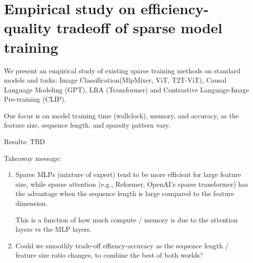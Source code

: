 \section{Empirical study on efficiency-quality tradeoff of sparse model training}
\label{sec:observations}

We present an empirical study of existing sparse training methods on standard models and tasks: Image Classification(MlpMixer, ViT, T2T-ViT),  Causal Language Modeling (GPT), LRA (Transformer) and Contrastive Language-Image Pre-training (CLIP).

Our focus is on model training time (wallclock), memory, and accuracy, as the feature size, sequence length, and sparsity pattern vary.

Results: TBD

Takeaway message:
\begin{enumerate}
  \item Sparse MLPs (mixture of expert) tend to be more efficient for large feature size, while sparse attention (e.g., Reformer, OpenAI's sparse transformer) has the advantage when the sequence length is large compared to the feature dimension.
  
  This is a function of how much compute / memory is due to the attention layers vs the MLP layers.
  
  \item Could we smoothly trade-off effiency-accuracy as the sequence length / feature size ratio changes, to combine the best of both worlds?
  
\end{enumerate}